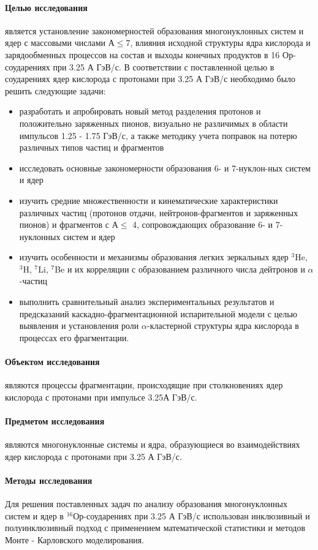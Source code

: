 \documentclass[fontsize=14pt]{scrarticle}
\begin{document}
\paragraph{Целью исследования}  является установление закономерностей образования многонуклонных систем и ядер с массовыми числами А$\le$7,
влияния исходной структуры ядра кислорода и зарядообменных процессов на состав и выходы конечных продуктов в 16 Ор-соударениях при 3.25 А ГэВ/с. В соответствии с поставленной целью в соударениях ядер кислорода с протонами при 3.25 А ГэВ/с необходимо было решить следующие задачи:
\begin{itemize}
    \item разработать и апробировать новый метод разделения протонов и положительно заряженных пионов, визуально не различимых в области импульсов 1.25 - 1.75 ГэВ/с, а также методику учета поправок на потерю различных типов частиц и фрагментов
    \item исследовать основные закономерности образования 6- и 7-нуклон-ных систем и ядер
    \item изучить средние множественности и кинематические характеристики различных частиц (протонов отдачи, нейтронов-фрагментов и заряженных пионов) и фрагментов с А$\le$ 4, сопровождающих образование 6- и 7- нуклонных систем и ядер
    \item изучить особенности и механизмы образования легких зеркальных ядер $^{3}$He, $^{3}$H, $^{7}$Li, $^{7}$Be и их корреляции с образованием различного числа дейтронов и $\alpha$-частиц
    \item выполнить сравнительный анализ экспериментальных результатов и предсказаний каскадно-фрагментационной испарительной модели с целью выявления и установления роли $\alpha$-кластерной структуры ядра кислорода в процессах его фрагментации.
\end{itemize}

\paragraph{Объектом исследования} являются процессы фрагментации, происходящие при столкновениях ядер кислорода с протонами при импульсе 3.25А ГэВ/с.
\paragraph{Предметом исследования}  являются многонуклонные системы и ядра, образующиеся во взаимодействиях ядер кислорода с протонами при 3.25 А ГэВ/с.
\paragraph{Методы исследования} Для решения поставленных задач по анализу образования многонуклонных систем и ядер в $^{16}$Ор-соударениях при 3.25 А ГэВ/с использован инклюзивный и полуинклюзивный подход с применением математической статистики и методов Монте - Карловского моделирования. 
\end{document}

